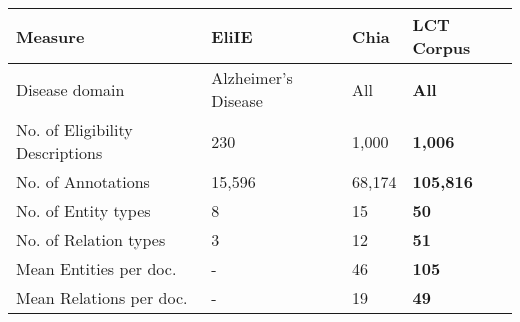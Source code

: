 
\begin{tabular}{l|lll} 
 \toprule
 Measure & EliIE \cite{kang2017eliie} & Chia \cite{kury2020chia} & \textbf{LCT Corpus} \\
 \hline
    Disease domain & Alzheimer's Disease & All & \textbf{All} \\
    No. of Eligibility Descriptions & 230 & 1,000 & \textbf{1,006} \\
    No. of Annotations & 15,596 & 68,174 & \textbf{105,816} \\
    No. of Entity types & 8 & 15 & \textbf{50} \\
    No. of Relation types & 3 & 12 & \textbf{51} \\
    Mean Entities per doc. & - & 46 & \textbf{105} \\
    Mean Relations per doc. & - & 19 & \textbf{49} \\
 \hline
\end{tabular}
